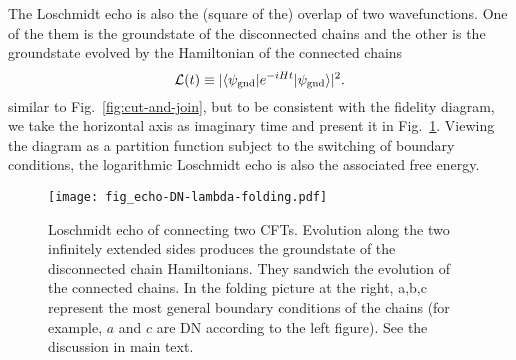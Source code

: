 The Loschmidt echo is also the (square of the) overlap of two wavefunctions. One of the them is the groundstate of the disconnected chains and the other is the groundstate evolved by the Hamiltonian of the connected chains
\begin{equation}
\mathcal{L}( t )  \equiv |\langle \psi_{\rm gnd}  | e^{-i H t } | \psi_{\rm gnd} \rangle|^2 .
\end{equation}
 similar to Fig.~\ref{fig:cut-and-join}, but to be consistent with the fidelity diagram, we take the horizontal axis as imaginary time and present it in Fig.~\ref{fig:echo}. Viewing the diagram as a partition function subject to the switching of boundary conditions, the logarithmic Loschmidt echo is also the associated free energy.  

\begin{figure}[h]
\centering
\texttt{[image: fig\_echo-DN-lambda-folding.pdf]}
\caption{Loschmidt echo of connecting two CFTs. Evolution along the two infinitely extended sides produces the groundstate of the disconnected chain Hamiltonians. They sandwich the evolution of the connected chains. In the folding picture at the right, a,b,c represent the most general boundary conditions of the chains (for example, $a$ and $c$ are DN according to the left figure). See the discussion in main text.}
\label{fig:echo}
\end{figure}

